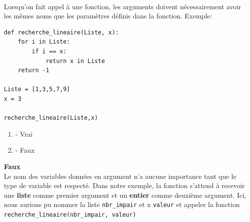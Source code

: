\begin{Exercice}[2 minutes]\\
Lorsqu'on fait appel à une fonction, les arguments doivent nécessairement avoir les mêmes noms que les paramètres définis dans la fonction. Exemple:\\
\begin{lstlisting}
def recherche_lineaire(Liste, x):
    for i in Liste:
        if i == x:
            return x in Liste
    return -1

Liste = [1,3,5,7,9]
x = 3

recherche_lineaire(Liste,x)

\end{lstlisting}
\begin{enumerate}
    \item - Vrai
    \item - Faux
\end{enumerate}
\begin{solution}
    \textbf{Faux}\\
    Le nom des variables données en argument n'a aucune importance tant que le type de variable est respecté. Dans notre exemple, la fonction s'attend à recevoir  une \textbf{liste} comme premier argument et un \textbf{entier} comme deuxième argument. Ici, nous aurions pu nommer la liste \lstinline{nbr_impair} et x \lstinline{valeur} et appeler la fonction \lstinline{recherche_lineaire(nbr_impair, valeur)}

\end{solution}
\end{Exercice}

